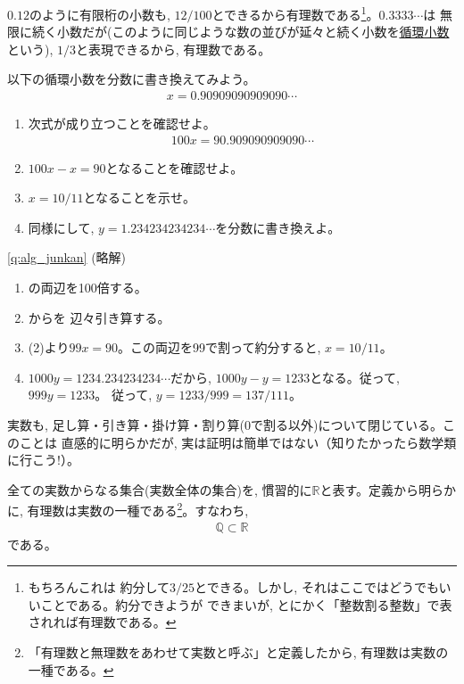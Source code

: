 $0.12$のように有限桁の小数も, $12/100$とできるから有理数である\footnote{もちろんこれは
約分して$3/25$とできる。しかし, それはここではどうでもいいことである。約分できようが
できまいが, とにかく「整数割る整数」で表されれば有理数である。}。$0.3333\cdots$は
無限に続く小数だが(このように同じような数の並びが延々と続く小数を\underline{循環小数}
という), $1/3$と表現できるから, 有理数である。

\begin{q}\label{q:alg_junkan} 
以下の循環小数を分数に書き換えてみよう。
\begin{eqnarray}x=0.90909090909090\cdots\label{eq:junkan0}\end{eqnarray}
\begin{enumerate}
\item 次式が成り立つことを確認せよ。
\begin{eqnarray}100x=90.909090909090\cdots\label{eq:junkan1}\end{eqnarray}
\item $100x-x=90$となることを確認せよ。
\item $x=10/11$となることを示せ。
\item 同様にして, $y=1.234234234234\cdots$を分数に書き換えよ。
\end{enumerate}
\end{q}
\mv

\ref{q:alg_junkan} (略解)
\begin{enumerate}
\item {}の両辺を100倍する。
\item {}からを
辺々引き算する。
\item (2)より$99x=90$。この両辺を99で割って約分すると, $x=10/11$。
\item $1000y=1234.234234234\cdots$だから, $1000y-y=1233$となる。従って, $999y=1233$。
従って, $y=1233/999=137/111$。
\end{enumerate}


実数も, 足し算・引き算・掛け算・割り算(0で割る以外)について閉じている。このことは
直感的に明らかだが, 実は証明は簡単ではない（知りたかったら数学類に行こう!）。

全ての実数からなる集合(実数全体の集合)を, 慣習的に$\mathbb{R}$と表す。定義から明らかに, 
有理数は実数の一種である\footnote{「有理数と無理数をあわせて実数と呼ぶ」と定義したから, 
有理数は実数の一種である。}。すなわち, 
\begin{eqnarray}\mathbb{Q}\subset\mathbb{R}\end{eqnarray}
である。

